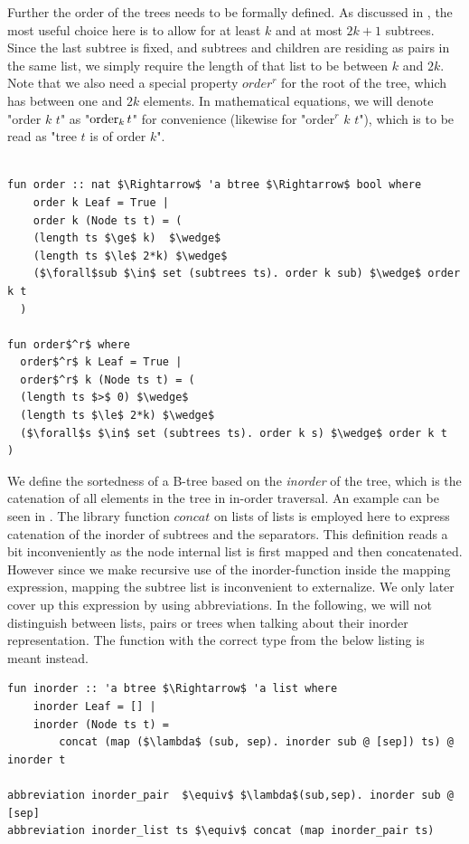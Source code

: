 Further the order of the trees needs to be formally defined.
As discussed in , the most useful choice here is
to allow for at least $k$ and at most $2k+1$ subtrees.
Since the last subtree is fixed, and subtrees and children are residing as pairs in the same list,
we simply require the length of that list to be between $k$ and $2k$.
Note that we also need a special property $order^r$ for the root of the tree,
which has between one and $2k$ elements.
In mathematical equations, we will denote "order $k$ $t$" as "$\operatorname{order}_k t$"
for convenience (likewise for "order$^r$ $k$ $t$"), which is to be read as
"tree $t$ is of order $k$".

\begin{lstlisting}[mathescape=true, language=Isabelle]

fun order :: nat $\Rightarrow$ 'a btree $\Rightarrow$ bool where
    order k Leaf = True |
    order k (Node ts t) = (
    (length ts $\ge$ k)  $\wedge$
    (length ts $\le$ 2*k) $\wedge$
    ($\forall$sub $\in$ set (subtrees ts). order k sub) $\wedge$ order k t
  )

fun order$^r$ where
  order$^r$ k Leaf = True |
  order$^r$ k (Node ts t) = (
  (length ts $>$ 0) $\wedge$
  (length ts $\le$ 2*k) $\wedge$
  ($\forall$s $\in$ set (subtrees ts). order k s) $\wedge$ order k t
)

\end{lstlisting}

We define the sortedness of a B-tree based on the \textit{inorder} of the tree,
which is the catenation of all elements in the tree in in-order traversal.
An example can be seen in .
The library function $concat$ on lists of lists
is employed here to express catenation of
the inorder of subtrees and the separators.
This definition reads a bit inconveniently
as the node internal list is first mapped and then concatenated.
However since we make recursive use of the inorder-function
inside the mapping expression, mapping the subtree list is inconvenient to externalize.
We only later cover up this expression by using abbreviations.
In the following, we will not distinguish between lists, 
pairs or trees when talking about their inorder representation.
The function with the correct type from the below listing is meant instead.

\begin{lstlisting}[mathescape=true, language=Isabelle]
fun inorder :: 'a btree $\Rightarrow$ 'a list where
    inorder Leaf = [] |
    inorder (Node ts t) = 
        concat (map ($\lambda$ (sub, sep). inorder sub @ [sep]) ts) @ inorder t

abbreviation inorder_pair  $\equiv$ $\lambda$(sub,sep). inorder sub @ [sep]
abbreviation inorder_list ts $\equiv$ concat (map inorder_pair ts)
\end{lstlisting}

